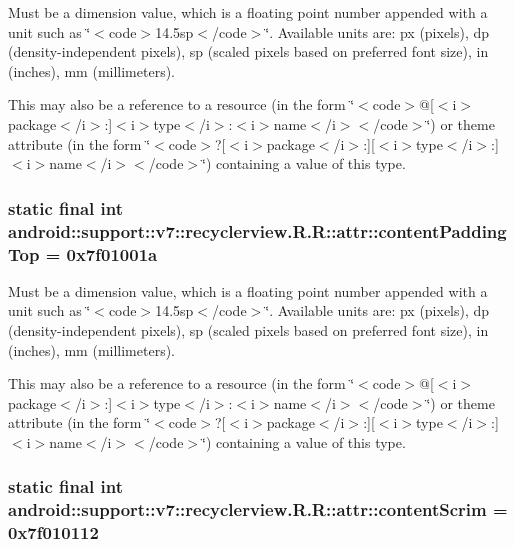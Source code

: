 Must be a dimension value, which is a floating point number appended with a unit such as \char`\"{}$<$code$>$14.5sp$<$/code$>$\char`\"{}. Available units are: px (pixels), dp (density-independent pixels), sp (scaled pixels based on preferred font size), in (inches), mm (millimeters). 

This may also be a reference to a resource (in the form \char`\"{}$<$code$>$@\mbox{[}$<$i$>$package$<$/i$>$:\mbox{]}$<$i$>$type$<$/i$>$:$<$i$>$name$<$/i$>$$<$/code$>$\char`\"{}) or theme attribute (in the form \char`\"{}$<$code$>$?\mbox{[}$<$i$>$package$<$/i$>$:\mbox{]}\mbox{[}$<$i$>$type$<$/i$>$:\mbox{]}$<$i$>$name$<$/i$>$$<$/code$>$\char`\"{}) containing a value of this type. \hypertarget{classandroid_1_1support_1_1v7_1_1recyclerview_1_1_r_1_1attr_3b0a1452edd7d02347481d6cbbbb31b8}{
\subsubsection[{contentPaddingTop}]{\setlength{\rightskip}{0pt plus 5cm}static final int android::support::v7::recyclerview.R.R::attr::contentPaddingTop = 0x7f01001a}}
\label{classandroid_1_1support_1_1v7_1_1recyclerview_1_1_r_1_1attr_3b0a1452edd7d02347481d6cbbbb31b8}


Must be a dimension value, which is a floating point number appended with a unit such as \char`\"{}$<$code$>$14.5sp$<$/code$>$\char`\"{}. Available units are: px (pixels), dp (density-independent pixels), sp (scaled pixels based on preferred font size), in (inches), mm (millimeters). 

This may also be a reference to a resource (in the form \char`\"{}$<$code$>$@\mbox{[}$<$i$>$package$<$/i$>$:\mbox{]}$<$i$>$type$<$/i$>$:$<$i$>$name$<$/i$>$$<$/code$>$\char`\"{}) or theme attribute (in the form \char`\"{}$<$code$>$?\mbox{[}$<$i$>$package$<$/i$>$:\mbox{]}\mbox{[}$<$i$>$type$<$/i$>$:\mbox{]}$<$i$>$name$<$/i$>$$<$/code$>$\char`\"{}) containing a value of this type. \hypertarget{classandroid_1_1support_1_1v7_1_1recyclerview_1_1_r_1_1attr_480ad2a5ff95594cc1c35fd79fd555c7}{
\subsubsection[{contentScrim}]{\setlength{\rightskip}{0pt plus 5cm}static final int android::support::v7::recyclerview.R.R::attr::contentScrim = 0x7f010112}}
\label{classandroid_1_1support_1_1v7_1_1recyclerview_1_1_r_1_1attr_480ad2a5ff95594cc1c35fd79fd555c7}


